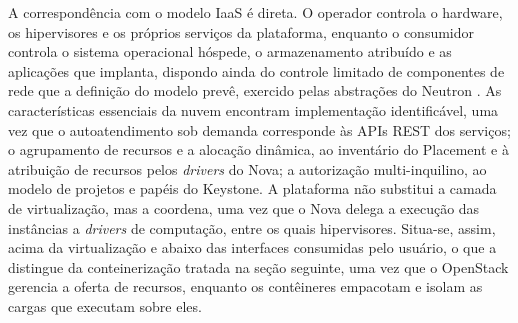 A correspondência com o modelo IaaS é direta. O operador controla o hardware, os hipervisores e os próprios serviços da plataforma, enquanto o consumidor controla o sistema operacional hóspede, o armazenamento atribuído e as aplicações que implanta, dispondo ainda do controle limitado de componentes de rede que a definição do modelo prevê, exercido pelas abstrações do Neutron \cite{liu2011nist, mell2011nist}. As características essenciais da nuvem encontram implementação identificável, uma vez que o autoatendimento sob demanda corresponde às APIs REST dos serviços; o agrupamento de recursos e a alocação dinâmica, ao inventário do Placement e à atribuição de recursos pelos \emph{drivers} do Nova; a autorização multi-inquilino, ao modelo de projetos e papéis do Keystone. A plataforma não substitui a camada de virtualização, mas a coordena, uma vez que o Nova delega a execução das instâncias a \emph{drivers} de computação, entre os quais hipervisores. Situa-se, assim, acima da virtualização e abaixo das interfaces consumidas pelo usuário, o que a distingue da conteinerização tratada na seção seguinte, uma vez que o OpenStack gerencia a oferta de recursos, enquanto os contêineres empacotam e isolam as cargas que executam sobre eles.

%
%
